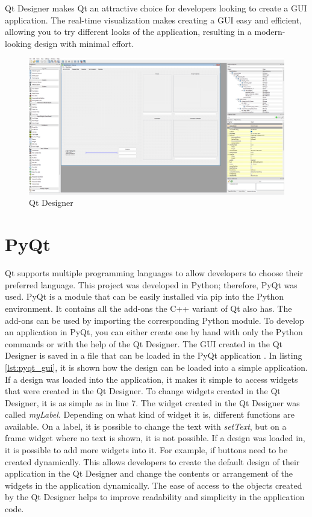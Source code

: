 Qt Designer makes Qt an attractive choice for developers looking to create a GUI application. 
The real-time visualization makes creating a GUI easy and efficient, allowing you to try different 
looks of the application, resulting in a modern-looking design with minimal effort.

\begin{figure}
    \centering
    \includegraphics[width=0.8\linewidth]{images/qt_designer.png}
    \caption{Qt Designer}
    \label{fig:qt_designer}
\end{figure}

\section{PyQt}
\label{sub:pyqt}


Qt supports multiple programming languages to allow developers to choose their preferred language. 
This project was developed in Python; therefore, PyQt was used. PyQt is a module that can be easily 
installed via pip into the Python environment. It contains all the add-ons the C++ variant of Qt also has. 
The add-ons can be used by importing the corresponding Python module. To develop an application in PyQt, you can either 
create one by hand with only the Python commands or with the help of the Qt Designer. The GUI created in the 
Qt Designer is saved in a file that can be loaded in the PyQt application \cite{pyqt}. 
In listing \ref{lst:pyqt_gui}, it is shown how the design can be loaded into a simple application. 
If a design was loaded into the application, it makes it simple to access widgets that were 
created in the Qt Designer. To change widgets created in the Qt Designer, it is as simple as in line 7. 
The widget created in the Qt Designer was called \textit{myLabel}. Depending on what kind 
of widget it is, different functions are available. On a label, it is possible to change the text with 
\textit{setText}, but on a frame widget where no text is shown, it is not possible. If a design was loaded in, 
it is possible to add more widgets into it. For example, if buttons need to be created dynamically. This allows 
developers to create the default design of their application in the Qt Designer and change the contents or 
arrangement of the widgets in the application dynamically. The ease of access to the objects created by the 
Qt Designer helps to improve readability and simplicity in the application code.

